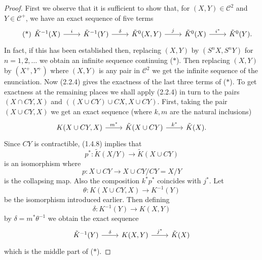 \documentclass[leqno]{book}
\numberwithin{equation}{section}
\theoremstyle{definition}
\begin{document}
            \begin{proof}
              First we observe that it is sufficient to show that, for $(X,Y)\in \mathcal{C}^{2}$ and $Y \in \mathcal{C}^{+}$, we have an exact sequence of five terms
                \begin{equation}              
                  \tag{*}
                  \begin{tikzcd}
                   \tilde{K}^{-1}(X) \arrow[r, "i^{}"] & \tilde{K}^{-1}(Y) \arrow[r, "\delta"] & \tilde{K}^{0}(X,Y) \arrow[r, "j^{}"] & \tilde{K}^{0}(X)\arrow [r, "i^{*}"] & \tilde{K}^{0}(Y). 
                  \end{tikzcd}
                \end{equation}
              In fact, if this has been established then, replacing $(X,Y)$ by $(S^{n}X,S^{n}Y)$ for $n=1,2, \ldots $ we obtain an infinite sequence continuing ($*$). Then replacing $(X,Y)$ by $(X^{+},Y^{+})$ where $(X,Y)$ is any pair in $\mathcal{C}^{2}$ we get the infinite sequence of the enunciation. Now (2.2.4) gives the exactness of the last three terms of ($*$). To get exactness at the remaining places we shall apply (2.2.4) in turn to the pairs $(X\cap CY,X)$ and $((X\cup CY)\cup CX,X\cup CY)$. First, taking the pair $(X\cup CY,X)$ we get an exact sequence (where $k,m$ are the natural inclusions)
              \begin{equation*}
                \begin{tikzcd}
                  K(X\cup CY,X)\arrow[r, "m^{*}"] & \tilde{K}(X\cup CY)\arrow[r, "k^{*}"] & \tilde{K}(X).
                \end{tikzcd}
              \end{equation*}
              Since $CY$ is contractible, (1.4.8) implies that
              \begin{equation*}
                p^{*}:\tilde{K}(X/Y)\to \tilde{K}(X\cup CY)
              \end{equation*}
              is an isomorphism where
              \begin{equation*}
                p:X\cup CY\to X\cup CY/CY=X/Y
              \end{equation*}
              is the collapsing map. Also the composition $k^{*}p^{*}$ coincides with $j^{*}$. Let
              \begin{equation*}
                \theta:K(X\cup CY,X)\to K^{-1}(Y)
              \end{equation*}
              be the isomorphism introduced earlier. Then defining
              \begin{equation*}
                \delta:K^{-1}(Y)\to K(X,Y)
              \end{equation*}
              by $\delta=m^{*}\theta^{-1}$ we obtain the exact sequence
              \begin{equation*}
                \begin{tikzcd}
                  \tilde{K}^{-1}(Y)\arrow[r, "\delta"] & K(X,Y)\arrow[r, "j^{*}"] & \tilde{K}(X)
                \end{tikzcd}
              \end{equation*}
              which is the middle part of ($*$).


\end{proof}
\end{document}
